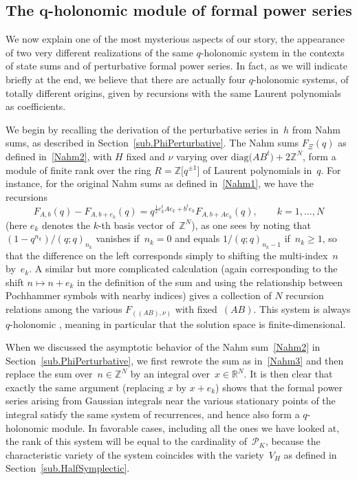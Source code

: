 \documentclass[pdftex]{sigma}
\numberwithin{equation}{section}
\def\calP{\mathcal P}
\def\calP{\mathcal P}
\def\R{\mathbb R}
\def\Z{\mathbb Z}
\def\m{ - }
\begin{document}
\subsection[The q-holonomic module of formal power series]{The $\boldsymbol{q}$-holonomic module of formal power series}
\label{sub.qholonomicPhi}

We now explain one of the most mysterious aspects of our story, the appearance
of two very different realizations of the same $q$-holonomic system in the
contexts of state sums and of perturbative formal power series. In fact, as
we will indicate briefly at the end, we believe that there are actually four
\hbox{$q$-holonomic} systems, of totally different origins, given by recursions
with the same Laurent polynomials as coefficients.

We begin by recalling the derivation of the perturbative series in~$h$ from Nahm sums,
as described in Section~\ref{sub.PhiPerturbative}.
The Nahm sums $F_\Xi(q)$ as defined in~\eqref{Nahm2}, with $H$ fixed and $\nu$
varying over $\text{diag}\big(AB^t\big)+2\Z^N$, form a module of finite rank over
the ring $R=\Z\big[q^{\pm1}\big]$ of Laurent polynomials in~$q$. For instance, for the
original Nahm sums as defined in~\eqref{Nahm1}, we have the recursions
\[
F_{A,b}(q) \m F_{A,b+e_k}(q) = q^{\frac12e_k^tAe_k+b^te_k}
F_{A,b+Ae_k}(q), \qquad k=1,\dots,N
\]
(here $e_k$ denotes the $k$-th basis vector of~$\Z^N$), as one sees by noting
that $(1-q^{n_k})/(q;q)_{n_k}$ vanishes if~$n_k=0$ and equals $1/(q;q)_{n_k-1}$
if~$n_k\ge1$, so that the difference on the left corresponds simply to
shifting the multi-index~$n$ by~$e_k$. A similar but more complicated calculation
(again corresponding to the shift $n\mapsto n+e_k$ in the definition of the sum
and using the relationship between Pochhammer symbols with nearby indices) gives
a collection of $N$ recursion relations among the various $F_{((A B),\nu)}$ with
fixed~$(A B)$. This system is always $q$-holonomic \cite{WZ}, meaning in
particular that the solution space is finite-dimensional.

When we discussed the asymptotic behavior of the Nahm sum~\eqref{Nahm2} in
Section~\ref{sub.PhiPerturbative}, we first rewrote the sum as in~\eqref{Nahm3} and
then replace the sum over~$n\in\Z^N$ by an integral over~$x\in\R^N$. It is then
clear that exactly the same argument (replacing $x$ by $x+e_k$) shows that the formal
power series arising from Gaussian integrals near the various stationary points of
the integral satisfy the same system of recurrences, and hence also form a
\hbox{$q$-holonomic} module. In favorable cases, including all the ones we have looked
at, the rank of this system will be equal to the cardinality of~$\calP_K$, because
the characteristic variety of the system coincides with the variety~$V_H$ as defined
in Section~\ref{sub.HalfSymplectic}.
\end{document}
